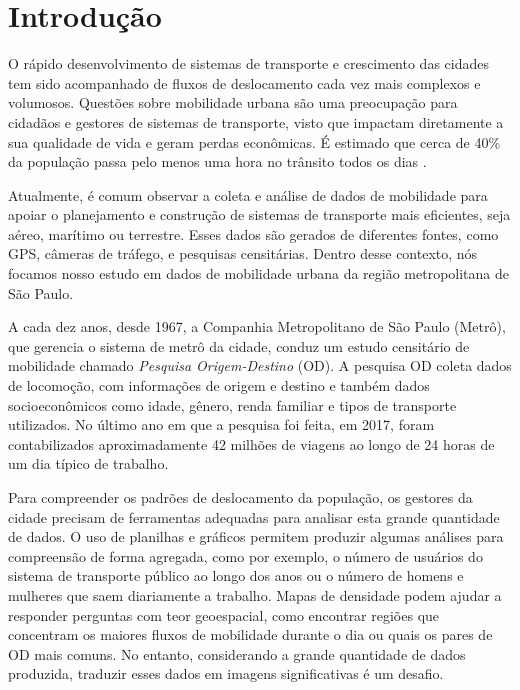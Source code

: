 \chapter{Introdução}
\label{cap:introducao}

O rápido  desenvolvimento de sistemas de transporte e crescimento das cidades
tem sido acompanhado de fluxos de deslocamento cada vez mais complexos e
volumosos. Questões sobre mobilidade urbana são uma preocupação para cidadãos e
gestores de sistemas de transporte, visto que impactam diretamente a sua
qualidade de vida e geram perdas econômicas. É estimado que cerca de 40\% da
população passa pelo menos uma hora no trânsito todos os dias \citep{Zhang2011}. 

Atualmente, é comum observar a coleta e análise de dados de mobilidade para
apoiar o planejamento e construção de sistemas de transporte mais eficientes,
seja aéreo, marítimo ou terrestre. Esses dados são gerados de diferentes
fontes, como GPS, câmeras de tráfego, e pesquisas censitárias. Dentro desse
contexto, nós focamos nosso estudo em dados de mobilidade urbana da região
metropolitana de S\~ao Paulo.

A cada dez anos, desde 1967, a Companhia Metropolitano de São Paulo (Metrô),
que gerencia o sistema de metrô da cidade, conduz um estudo censitário de
mobilidade chamado \emph{Pesquisa Origem-Destino} (OD). A pesquisa OD coleta
dados de locomoção, com informações de origem e destino e também dados
socioeconômicos como idade, gênero, renda familiar e tipos de transporte
utilizados. No último ano em que a pesquisa foi feita, em 2017, foram
contabilizados aproximadamente 42 milhões de viagens ao longo de 24 horas de um
dia típico de trabalho.

Para compreender os padrões de deslocamento da população, os gestores da cidade
precisam de ferramentas adequadas para analisar esta grande quantidade de
dados. O uso de planilhas e gráficos permitem produzir algumas análises para
compreensão de forma agregada,  como por exemplo, o número de usuários do
sistema de transporte público ao longo dos anos ou o número de homens e
mulheres que saem diariamente a trabalho. Mapas de densidade podem ajudar a
responder perguntas com teor geoespacial, como encontrar regiões que concentram
os maiores fluxos de mobilidade durante o dia ou quais os pares de
OD mais comuns. No entanto, considerando a grande quantidade
de dados produzida, traduzir esses dados em imagens significativas é um desafio.

